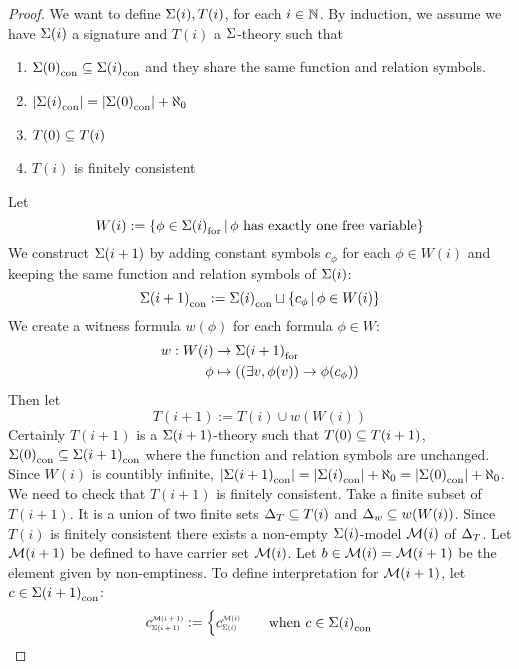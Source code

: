 \begin{proof}
    We want to define $\Sigma(i),T(i)$, 
    for each $i \in \mathbb{N}$.    
    By induction, 
    we assume we have $\Sigma(i)$ a signature and 
    $T(i)$ a $\Sigma$-theory such that 
    \begin{enumerate}
        \item ${\Sigma(0)}_\mathrm{con} \subseteq {\Sigma(i)}_\mathrm{con}$
        and they share the same function and relation symbols.
        \item $|{\Sigma(i)}_\mathrm{con}| = |{\Sigma(0)}_\mathrm{con}| + \aleph_0$
        \item $T(0) \subseteq T(i)$
        \item $T(i)$ is finitely consistent
    \end{enumerate}
    Let 
    \[
        W(i) := \left\{\phi \in {\Sigma(i)}_\mathrm{for} 
        \,|\, \phi \text{ has exactly one free variable}\right\}
    \]
    We construct $\Sigma(i+1)$ 
    by adding constant symbols $c_\phi$ for each $\phi \in W(i)$ and 
    keeping the same function and relation symbols of $\Sigma(i)$:
    \[
        {\Sigma(i+1)}_\mathrm{con} :=
        {\Sigma(i)}_\mathrm{con} \sqcup \left\{c_\phi
        \,|\, \phi \in W(i)\right\}
    \]
    We create a witness formula $w(\phi)$ for each formula $\phi \in W$:
    \begin{align*}
        w : W(i) &\to {\Sigma(i+1)}_\mathrm{for}\\
        \phi &\mapsto ((\exists v, \phi(v)) \to \phi(c_\phi))
    \end{align*}
    Then let \[T(i+1) := T(i) \cup w(W(i))\]
    Certainly
    $T(i+1)$ is a $\Sigma(i+1)$-theory such that $T(0) \subseteq T(i+1)$,
    ${\Sigma(0)}_\mathrm{con} \subseteq {\Sigma(i+1)}_\mathrm{con}$ 
    where the function and relation symbols are unchanged.
    Since $W(i)$ is countibly infinite, 
    $|{\Sigma(i+1)}_\mathrm{con}| = |{\Sigma(i)}_\mathrm{con}| + \aleph_0 = 
    |{\Sigma(0)}_\mathrm{con}| + \aleph_0 $.
    We need to check that $T(i+1)$ is finitely consistent.
    Take a finite subset of $T(i+1)$.
    It is a union of two finite sets 
    $\Delta_T \subseteq T(i)$ and $\Delta_w \subseteq w(W(i))$.
    Since $T(i)$ is finitely consistent there exists a non-empty $\Sigma(i)$-model
    $\mathcal{M}(i)$ of $\Delta_T$.
    Let $\mathcal{M}(i+1)$ be defined to have carrier set ${\mathcal{M}(i)}$.
    Let $b \in {\mathcal{M}(i)} = \mathcal{M}(i+1)$ be the element given by non-emptiness.
    To define interpretation for $\mathcal{M}(i+1)$, 
    let $c \in {\Sigma(i+1)}_\mathrm{con}$:
    \[
        \subintp{\Si(i+1)}{\MM(i+1)}{c} := 
        \begin{cases}
            \subintp{\Si(i)}{\MM(i)}{c} \quad &\text{when }  
            c \in \const{\Si(i)} \\

\end{cases}\]
\end{proof}
